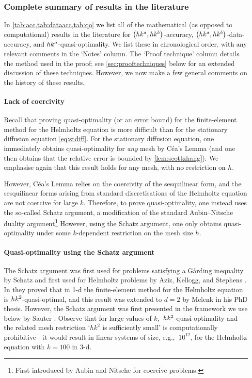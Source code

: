 \subsubsection{Complete summary of results in the literature}

In \cref{tab:acc,tab:dataacc,tab:qo} we list all of the mathematical (as opposed to computational) results in the literature for $\hk{a}b$-accuracy, $\hk{a}b$-data-accuracy, and $hk^{a}$-quasi-optimality. We list these in chronological order, with any relevant comments in the `Notes' column. The `Proof technique' column details the method used in the proof; see \cref{sec:prooftechniques} below for an extended discussion of these techniques. However, we now make a few general comments on the history of these results.

\paragraph{Lack of coercivity} Recall that proving quasi-optimality (or an error bound) for the finite-element method for the Helmholtz equation is more difficult than for the stationary diffusion equation \cref{eq:stdiff}. For the stationary diffusion equation, one immediately obtains quasi-optimality for \emph{any} mesh by C\'ea's Lemma (and one then obtains that the relative error is bounded by \cref{lem:scottzhang}). We emphasise again that this result holds for any mesh, with no restriction on $h.$

However, C\'ea's Lemma relies on the coercivity of the sesquilinear form, and the sesquilinear forms arising from standard discretisations of the Helmholtz equation are not coercive for large $k$. Therefore, to prove quasi-optimality, one instead uses the so-called Schatz argument, a modification of the standard Aubin--Nitsche duality argument\footnote{First introduced by Aubin \cite{Au:67} and Nitsche \cite{Ni:68} for coercive problems.} However, using the Schatz argument, one only obtains quasi-optimality under some $k$-dependent restriction on the mesh size $h.$

\paragraph{Quasi-optimality using the Schatz argument} The Schatz argument was first used for problems satisfying a G\r{a}rding inequality by Schatz \cite{Sc:74} and first used for Helmholtz problems by Aziz, Kellogg, and Stephens \cite{AzKeSt:88}. In \cite{AzKeSt:88} they proved that in 1-d the finite-element method for the Helmholtz equation is $hk^{2}$-quasi-optimal, and this result was extended to $d=2$ by Melenk \cite{Me:95} in his PhD thesis. However, the Schatz argument was first presented in the framework we use below by Sauter \cite[Section 2]{Sa:06}. Observe that for large values of $k,$ $hk^{2}$-quasi-optimality and the related mesh restriction `$hk^2$ is sufficiently small' is computationally prohibitive---it would result in linear systems of size, e.g., $~10^{12}$, for the Helmholtz equation with $k=100$ in 3-d.

